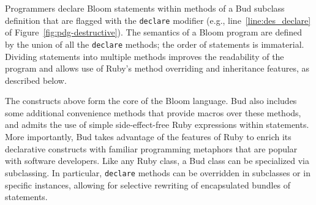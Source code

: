 Programmers declare Bloom statements within methods of a Bud subclass
definition that are flagged with the \texttt{declare} modifier (e.g.,
line~\ref{line:des_declare} of Figure~\ref{fig:pdg-destructive}). The semantics
of a Bloom program are defined by the union of all the \texttt{declare}
methods; the order of statements is immaterial. Dividing statements into multiple
methods improves the readability of the program and allows use of Ruby's method
overriding and inheritance features, as described below.


The constructs above form the core of the Bloom language.
Bud also includes some additional convenience methods that provide macros over these methods, and admits the use of simple side-effect-free Ruby expressions within statements.  More importantly, Bud takes advantage of the features of Ruby to enrich its declarative constructs with familiar programming metaphors that are popular with software developers.  Like any Ruby class, a Bud class can be specialized via subclassing.  In particular, \texttt{declare} methods can be overridden in subclasses or in specific instances, allowing for selective rewriting of encapsulated bundles of statements.%

\begin{comment}
Conventional wisdom in certain quarters says that rule-based languages are untenable for large programs that evolve over time, since the interactions among rules become too difficult to understand.  We believe this concern is an artifact of early rule languages that mixed apparently declarative syntax with imperative constructs and assumptions.  In fact, we demonstrate below that the pure logic-programming roots of Bloom can allow programmers to reason about many program interactions in a much deeper way than traditional imperative languages.
\end{comment}

